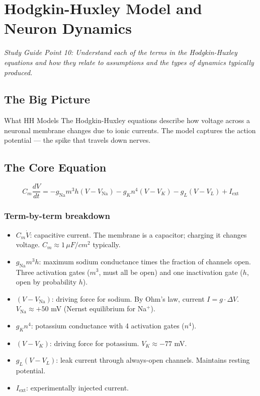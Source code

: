 \documentclass[11pt]{article}
\begin{document}
\section{Hodgkin-Huxley Model and Neuron Dynamics}

\textit{Study Guide Point 10: Understand each of the terms in the Hodgkin-Huxley equations and how they relate to assumptions and the types of dynamics typically produced.}

\subsection{The Big Picture}

\begin{conceptbox}{What HH Models}
The Hodgkin-Huxley equations describe how voltage across a neuronal membrane changes due to ionic currents. The model captures the action potential --- the spike that travels down nerves.
\end{conceptbox}

\subsection{The Core Equation}

\[
C_m \frac{dV}{dt} = -g_{\text{Na}} m^3 h(V - V_{\text{Na}}) - g_K n^4 (V - V_K) - g_L (V - V_L) + I_{\text{ext}}
\]

\subsubsection{Term-by-term breakdown}
\begin{itemize}
\item $C_m \dot V$: capacitive current. The membrane is a capacitor; charging it changes voltage. $C_m \approx 1\,\mu F/cm^2$ typically.
\item $g_{\text{Na}} m^3 h$: maximum sodium conductance times the fraction of channels open. Three activation gates ($m^3$, must all be open) and one inactivation gate ($h$, open by probability $h$).
\item $(V - V_{\text{Na}})$: driving force for sodium. By Ohm's law, current $I = g\cdot \Delta V$. $V_{\text{Na}} \approx +50$ mV (Nernst equilibrium for Na$^+$).
\item $g_K n^4$: potassium conductance with 4 activation gates ($n^4$).
\item $(V - V_K)$: driving force for potassium. $V_K \approx -77$ mV.
\item $g_L (V - V_L)$: leak current through always-open channels. Maintains resting potential.
\item $I_{\text{ext}}$: experimentally injected current.
\end{itemize}
\end{document}
